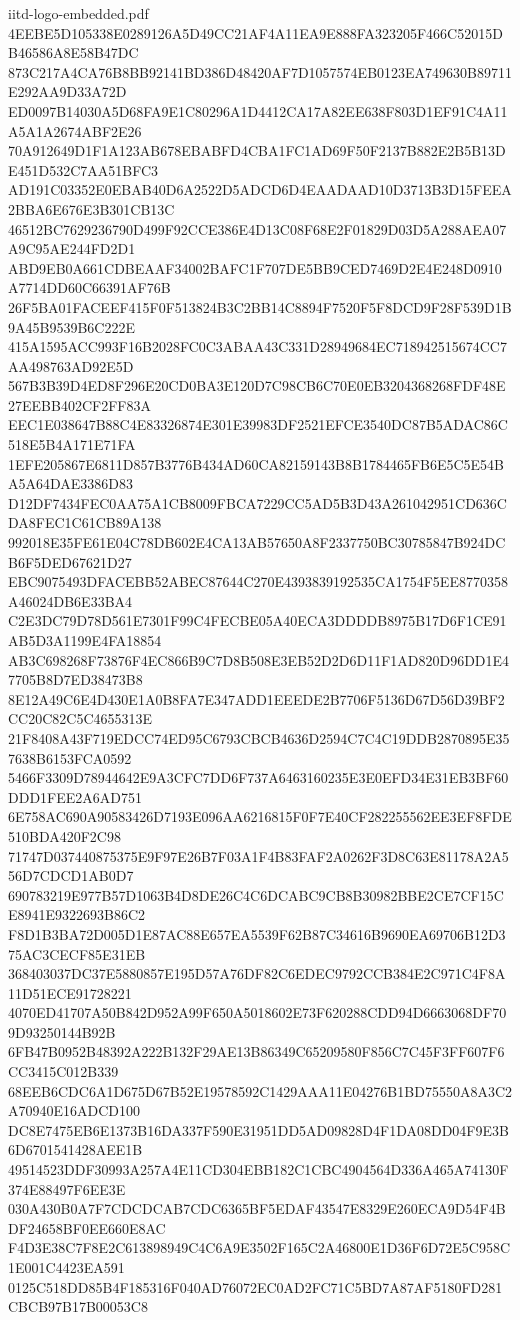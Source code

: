 \begin{filecontents*}[overwrite]{iitd-logo-embedded.pdf}
4EEBE5D105338E0289126A5D49CC21AF4A11EA9E888FA323205F466C52015DB46586A8E58B47DC
873C217A4CA76B8BB92141BD386D48420AF7D1057574EB0123EA749630B89711E292AA9D33A72D
ED0097B14030A5D68FA9E1C80296A1D4412CA17A82EE638F803D1EF91C4A11A5A1A2674ABF2E26
70A912649D1F1A123AB678EBABFD4CBA1FC1AD69F50F2137B882E2B5B13DE451D532C7AA51BFC3
AD191C03352E0EBAB40D6A2522D5ADCD6D4EAADAAD10D3713B3D15FEEA2BBA6E676E3B301CB13C
46512BC7629236790D499F92CCE386E4D13C08F68E2F01829D03D5A288AEA07A9C95AE244FD2D1
ABD9EB0A661CDBEAAF34002BAFC1F707DE5BB9CED7469D2E4E248D0910A7714DD60C66391AF76B
26F5BA01FACEEF415F0F513824B3C2BB14C8894F7520F5F8DCD9F28F539D1B9A45B9539B6C222E
415A1595ACC993F16B2028FC0C3ABAA43C331D28949684EC718942515674CC7AA498763AD92E5D
567B3B39D4ED8F296E20CD0BA3E120D7C98CB6C70E0EB3204368268FDF48E27EEBB402CF2FF83A
EEC1E038647B88C4E83326874E301E39983DF2521EFCE3540DC87B5ADAC86C518E5B4A171E71FA
1EFE205867E6811D857B3776B434AD60CA82159143B8B1784465FB6E5C5E54BA5A64DAE3386D83
D12DF7434FEC0AA75A1CB8009FBCA7229CC5AD5B3D43A261042951CD636CDA8FEC1C61CB89A138
992018E35FE61E04C78DB602E4CA13AB57650A8F2337750BC30785847B924DCB6F5DED67621D27
EBC9075493DFACEBB52ABEC87644C270E4393839192535CA1754F5EE8770358A46024DB6E33BA4
C2E3DC79D78D561E7301F99C4FECBE05A40ECA3DDDDB8975B17D6F1CE91AB5D3A1199E4FA18854
AB3C698268F73876F4EC866B9C7D8B508E3EB52D2D6D11F1AD820D96DD1E47705B8D7ED38473B8
8E12A49C6E4D430E1A0B8FA7E347ADD1EEEDE2B7706F5136D67D56D39BF2CC20C82C5C4655313E
21F8408A43F719EDCC74ED95C6793CBCB4636D2594C7C4C19DDB2870895E357638B6153FCA0592
5466F3309D78944642E9A3CFC7DD6F737A6463160235E3E0EFD34E31EB3BF60DDD1FEE2A6AD751
6E758AC690A90583426D7193E096AA6216815F0F7E40CF282255562EE3EF8FDE510BDA420F2C98
71747D037440875375E9F97E26B7F03A1F4B83FAF2A0262F3D8C63E81178A2A556D7CDCD1AB0D7
690783219E977B57D1063B4D8DE26C4C6DCABC9CB8B30982BBE2CE7CF15CE8941E9322693B86C2
F8D1B3BA72D005D1E87AC88E657EA5539F62B87C34616B9690EA69706B12D375AC3CECF85E31EB
368403037DC37E5880857E195D57A76DF82C6EDEC9792CCB384E2C971C4F8A11D51ECE91728221
4070ED41707A50B842D952A99F650A5018602E73F620288CDD94D6663068DF709D93250144B92B
6FB47B0952B48392A222B132F29AE13B86349C65209580F856C7C45F3FF607F6CC3415C012B339
68EEB6CDC6A1D675D67B52E19578592C1429AAA11E04276B1BD75550A8A3C2A70940E16ADCD100
DC8E7475EB6E1373B16DA337F590E31951DD5AD09828D4F1DA08DD04F9E3B6D6701541428AEE1B
49514523DDF30993A257A4E11CD304EBB182C1CBC4904564D336A465A74130F374E88497F6EE3E
030A430B0A7F7CDCDCAB7CDC6365BF5EDAF43547E8329E260ECA9D54F4BDF24658BF0EE660E8AC
F4D3E38C7F8E2C613898949C4C6A9E3502F165C2A46800E1D36F6D72E5C958C1E001C4423EA591
0125C518DD85B4F185316F040AD76072EC0AD2FC71C5BD7A87AF5180FD281CBCB97B17B00053C8

\end{filecontents*}
